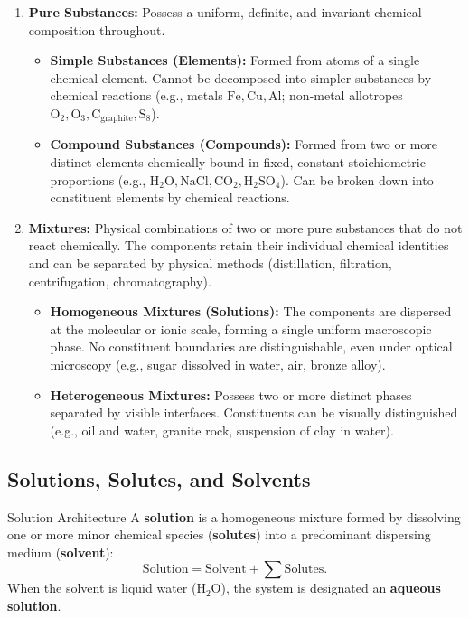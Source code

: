 \begin{enumerate}[leftmargin=1.5em,itemsep=3pt]
  \item \textbf{Pure Substances:} Possess a uniform, definite, and invariant chemical composition throughout.
  \begin{itemize}[leftmargin=1.2em]
    \item \textbf{Simple Substances (Elements):} Formed from atoms of a single chemical element. Cannot be decomposed into simpler substances by chemical reactions (e.g., metals $\mathrm{Fe, Cu, Al}$; non-metal allotropes $\mathrm{O_2, O_3, C_{\text{graphite}}, S_8}$).
    \item \textbf{Compound Substances (Compounds):} Formed from two or more distinct elements chemically bound in fixed, constant stoichiometric proportions (e.g., $\mathrm{H_2O, NaCl, CO_2, H_2SO_4}$). Can be broken down into constituent elements by chemical reactions.
  \end{itemize}
  \item \textbf{Mixtures:} Physical combinations of two or more pure substances that do not react chemically. The components retain their individual chemical identities and can be separated by physical methods (distillation, filtration, centrifugation, chromatography).
  \begin{itemize}[leftmargin=1.2em]
    \item \textbf{Homogeneous Mixtures (Solutions):} The components are dispersed at the molecular or ionic scale, forming a single uniform macroscopic phase. No constituent boundaries are distinguishable, even under optical microscopy (e.g., sugar dissolved in water, air, bronze alloy).
    \item \textbf{Heterogeneous Mixtures:} Possess two or more distinct phases separated by visible interfaces. Constituents can be visually distinguished (e.g., oil and water, granite rock, suspension of clay in water).
  \end{itemize}
\end{enumerate}

\subsection{Solutions, Solutes, and Solvents}

\begin{definitionbox}{Solution Architecture}
A \textbf{solution} is a homogeneous mixture formed by dissolving one or more minor chemical species (\textbf{solutes}) into a predominant dispersing medium (\textbf{solvent}):
\begin{equation}
\text{Solution} = \text{Solvent} + \sum \text{Solutes}.
\end{equation}
When the solvent is liquid water ($\mathrm{H_2O}$), the system is designated an \textbf{aqueous solution}.
\end{definitionbox}


